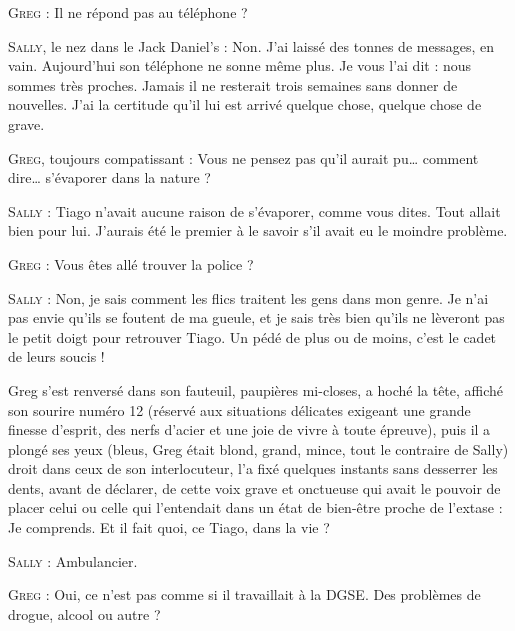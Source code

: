 \begin{dialogue}

\textsc{Greg} : Il ne répond pas au téléphone ?

\textsc{Sally}, le nez dans le Jack Daniel’s : Non. J’ai laissé des tonnes de messages, en vain. Aujourd’hui son téléphone ne sonne même plus. Je vous l’ai dit : nous sommes très proches. Jamais il ne resterait trois semaines sans donner de nouvelles. J’ai la certitude qu’il lui est arrivé quelque chose, quelque chose de grave.

\textsc{Greg}, toujours compatissant : Vous ne pensez pas qu’il aurait pu… comment dire… s’évaporer dans la nature ?

\textsc{Sally} : Tiago n’avait aucune raison de s’évaporer, comme vous dites. Tout allait bien pour lui. J’aurais été le premier à le savoir s’il avait eu le moindre problème.

\textsc{Greg} : Vous êtes allé trouver la police ?

\textsc{Sally} : Non, je sais comment les flics traitent les gens dans mon genre. Je n’ai pas envie qu’ils se foutent de ma gueule, et je sais très bien qu’ils ne lèveront pas le petit doigt pour retrouver Tiago. Un pédé de plus ou de moins, c’est le cadet de leurs soucis !

Greg s’est renversé dans son fauteuil, paupières mi-closes, a hoché la tête, affiché son sourire numéro 12 (réservé aux situations délicates exigeant une grande finesse d’esprit, des nerfs d’acier et une joie de vivre à toute épreuve), puis il a plongé ses yeux (bleus, Greg était blond, grand, mince, tout le contraire de Sally) droit dans ceux de son interlocuteur, l’a fixé quelques instants sans desserrer les dents, avant de déclarer, de cette voix grave et onctueuse qui avait le pouvoir de placer celui ou celle qui l’entendait dans un état de bien-être proche de l’extase : Je comprends. Et il fait quoi, ce Tiago, dans la vie ?

\textsc{Sally} : Ambulancier.

%
%
%
\textsc{Greg} : Oui, ce n’est pas comme si il travaillait à la DGSE. Des problèmes de drogue, alcool ou autre ?


\end{dialogue}
